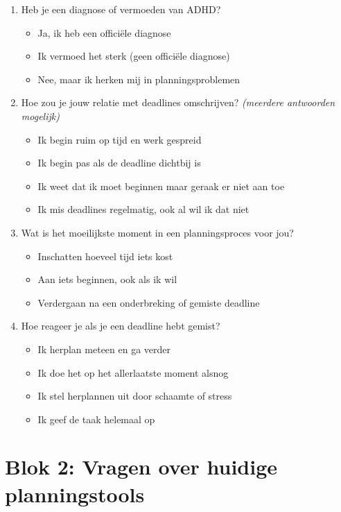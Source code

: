 \begin{enumerate}
  \item Heb je een diagnose of vermoeden van ADHD?
  \begin{itemize}
    \item Ja, ik heb een officiële diagnose
    \item Ik vermoed het sterk (geen officiële diagnose)
    \item Nee, maar ik herken mij in planningsproblemen
  \end{itemize}
  \item Hoe zou je jouw relatie met deadlines omschrijven? \textit{(meerdere antwoorden mogelijk)}
  \begin{itemize}
    \item Ik begin ruim op tijd en werk gespreid
    \item Ik begin pas als de deadline dichtbij is
    \item Ik weet dat ik moet beginnen maar geraak er niet aan toe
    \item Ik mis deadlines regelmatig, ook al wil ik dat niet
  \end{itemize}
  \item Wat is het moeilijkste moment in een planningsproces voor jou?
  \begin{itemize}
    \item Inschatten hoeveel tijd iets kost
    \item Aan iets beginnen, ook als ik wil
    \item Verdergaan na een onderbreking of gemiste deadline
  \end{itemize}
  \item Hoe reageer je als je een deadline hebt gemist?
  \begin{itemize}
    \item Ik herplan meteen en ga verder
    \item Ik doe het op het allerlaatste moment alsnog
    \item Ik stel herplannen uit door schaamte of stress
    \item Ik geef de taak helemaal op
  \end{itemize}
\end{enumerate}

\section*{Blok 2: Vragen over huidige planningstools}

